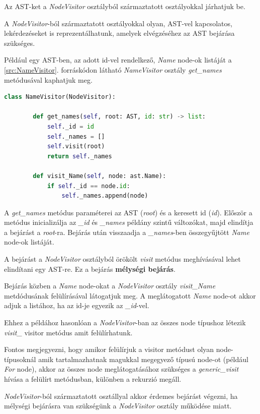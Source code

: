 Az AST-ket a \emph{NodeVisitor} osztályból származtatott osztályokkal járhatjuk be.

A \emph{NodeVisitor}-ból származtatott osztályokkal olyan, AST-vel kapcsolatos,
lekérdezéseket is reprezentálhatunk, amelyek elvégzéséhez az AST bejárása szükséges.

Például egy AST-ben, az adott id-vel rendelkező, \emph{Name} node-ok listáját
a \ref{src:NameVisitor}. forráskódon látható \emph{NameVisitor} osztály
\emph{get\_names} metódusával kaphatjuk meg.

\begin{lstlisting}[language={Python}]
	class NameVisitor(NodeVisitor):
		
		def get_names(self, root: AST, id: str) -> list:
			self._id = id
			self._names = []
			self.visit(root)
			return self._names
		
		def visit_Name(self, node: ast.Name):
			if self._id == node.id:
				self._names.append(node)
\end{lstlisting}

A \emph{get\_names} metódus paraméterei az AST (\emph{root}) és a keresett id (\emph{id}).
Először a metódus inicializálja az \emph{\_id} és \emph{\_names} példány szintű változókat,
majd elindítja a bejárást a \emph{root}-ra.
Bejárás után visszaadja a \emph{\_names}-ben összegyűjtött \emph{Name} node-ok listáját.

A bejárást a \emph{NodeVisitor} osztályból örökölt \emph{visit} metódus meghívásával
lehet elindítani egy AST-re. Ez a bejárás \textbf{mélységi bejárás}.

Bejárás közben a \emph{Name} node-okat a \emph{NodeVisitor} osztály \emph{visit\_Name}
metdódusának felülírásával látogatjuk meg.
A meglátogatott \emph{Name} node-ot akkor adjuk a listához,
ha az id-je egyezik az \emph{\_id}-vel.

Ehhez a példához hasonlóan a \emph{NodeVisitor}-ban az összes node típushoz
létezik \emph{visit\_<node-class>} visitor metódus amit felülírhatunk.

Fontos megjegyezni, hogy amikor felülírjuk a visitor metódust olyan node-típusoknál
amik tartalmazhatnak magukkal megegyező típusú node-ot (például \emph{For} node),
akkor az összes node meglátogatásához szükséges a \emph{generic\_visit} hívása
a felülírt metódusban, különben a rekurzió megáll.

\emph{NodeVisitor}-ból származtatott osztállyal akkor érdemes bejárást végezni,
ha mélységi bejárásra van szükségünk a \emph{NodeVisitor} osztály működése miatt.

